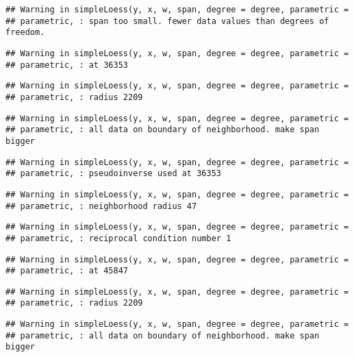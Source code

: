 \documentclass[]{article}
\begin{document}
\begin{verbatim}
## Warning in simpleLoess(y, x, w, span, degree = degree, parametric =
## parametric, : span too small. fewer data values than degrees of freedom.
\end{verbatim}

\begin{verbatim}
## Warning in simpleLoess(y, x, w, span, degree = degree, parametric =
## parametric, : at 36353
\end{verbatim}

\begin{verbatim}
## Warning in simpleLoess(y, x, w, span, degree = degree, parametric =
## parametric, : radius 2209
\end{verbatim}

\begin{verbatim}
## Warning in simpleLoess(y, x, w, span, degree = degree, parametric =
## parametric, : all data on boundary of neighborhood. make span bigger
\end{verbatim}

\begin{verbatim}
## Warning in simpleLoess(y, x, w, span, degree = degree, parametric =
## parametric, : pseudoinverse used at 36353
\end{verbatim}

\begin{verbatim}
## Warning in simpleLoess(y, x, w, span, degree = degree, parametric =
## parametric, : neighborhood radius 47
\end{verbatim}

\begin{verbatim}
## Warning in simpleLoess(y, x, w, span, degree = degree, parametric =
## parametric, : reciprocal condition number 1
\end{verbatim}

\begin{verbatim}
## Warning in simpleLoess(y, x, w, span, degree = degree, parametric =
## parametric, : at 45847
\end{verbatim}

\begin{verbatim}
## Warning in simpleLoess(y, x, w, span, degree = degree, parametric =
## parametric, : radius 2209
\end{verbatim}

\begin{verbatim}
## Warning in simpleLoess(y, x, w, span, degree = degree, parametric =
## parametric, : all data on boundary of neighborhood. make span bigger
\end{verbatim}
\end{document}
